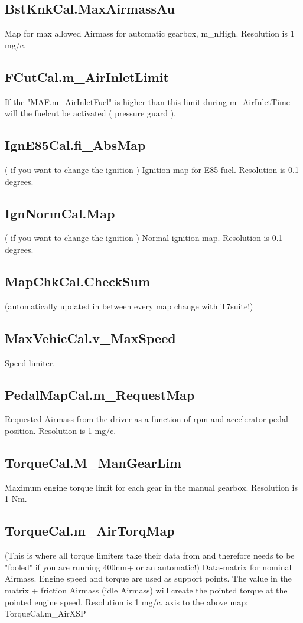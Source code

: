 \documentclass[11pt,a4paper]{book}
\begin{document}
\subsection{BstKnkCal.MaxAirmassAu}
Map for max allowed Airmass for automatic gearbox, m\_nHigh. Resolution is 1 mg/c.

\subsection{FCutCal.m\_AirInletLimit}
If the "MAF.m\_AirInletFuel" is higher than this limit during m\_AirInletTime will the fuelcut be activated
( pressure guard ).

\subsection{IgnE85Cal.fi\_AbsMap}
( if you want to change the ignition )
Ignition map for E85 fuel. Resolution is 0.1 degrees.

\subsection{IgnNormCal.Map}
( if you want to change the ignition )
Normal ignition map. Resolution is 0.1 degrees.

\subsection{MapChkCal.CheckSum}
(automatically updated in between every map
change with T7suite!)

\subsection{MaxVehicCal.v\_MaxSpeed}
Speed limiter.

\subsection{PedalMapCal.m\_RequestMap}
Requested Airmass from the driver as a function of rpm and accelerator pedal position. Resolution is 1
mg/c.
\subsection{TorqueCal.M\_ManGearLim}
Maximum engine torque limit for each gear in the manual gearbox. Resolution is 1 Nm.

\subsection{TorqueCal.m\_AirTorqMap}
(This is where all torque limiters take their data from and therefore
needs to be "fooled" if you are running 400nm+ or an automatic!)
Data-matrix for nominal Airmass. Engine speed and torque are used as support points. The value in
the matrix + friction Airmass (idle Airmass) will create the pointed torque at the pointed engine speed.
Resolution is 1 mg/c. axis to the above map: TorqueCal.m\_AirXSP
\end{document}
